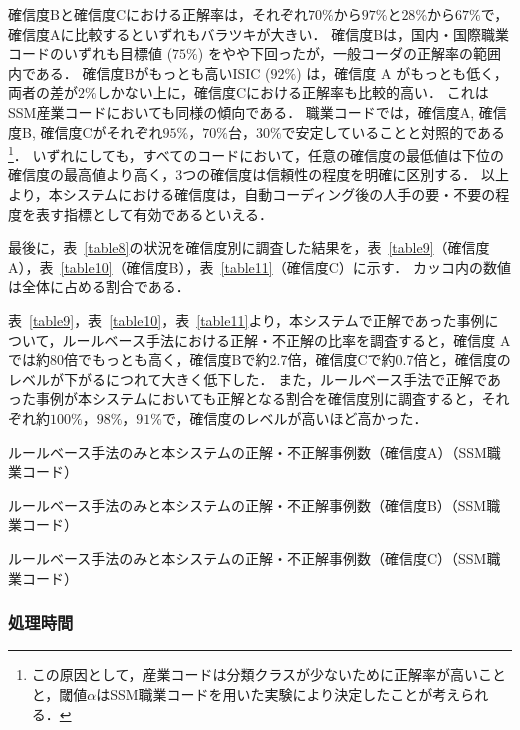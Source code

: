 \documentclass[japanese]{jnlp_1.4}
\begin{document}
確信度Bと確信度Cにおける正解率は，それぞれ$70\%$から$97\%$と$28\%$から$67\%$で，確信度Aに比較するといずれもバラツキが大きい．
確信度Bは，国内・国際職業コードのいずれも目標値 ($75\%$) をやや下回ったが，一般コーダの正解率の範囲内である． 
確信度Bがもっとも高いISIC ($92\%$) は，確信度 A がもっとも低く，両者の差が$2\%$しかない上に，確信度Cにおける正解率も比較的高い．
これはSSM産業コードにおいても同様の傾向である．
職業コードでは，確信度A, 確信度B, 確信度Cがそれぞれ$95\%$，$70\%$台，$30\%$で安定していることと対照的である\footnote{この原因として，産業コードは分類クラスが少ないために正解率が高いことと，閾値$\alpha$はSSM職業コードを用いた実験により決定したことが考えられる．}．
いずれにしても，すべてのコードにおいて，任意の確信度の最低値は下位の確信度の最高値より高く，3つの確信度は信頼性の程度を明確に区別する．
以上より，本システムにおける確信度は，自動コーディング後の人手の要・不要の程度を表す指標として有効であるといえる．

最後に，表~\ref{table8}の状況を確信度別に調査した結果を，表~\ref{table9}（確信度 A），表~\ref{table10}（確信度B），表~\ref{table11}（確信度C）に示す．
カッコ内の数値は全体に占める割合である．

表~\ref{table9}，表~\ref{table10}，表~\ref{table11}より，本システムで正解であった事例について，ルールベース手法における正解・不正解の比率を調査すると，確信度 A では約80倍でもっとも高く，確信度Bで約2.7倍，確信度Cで約0.7倍と，確信度のレベルが下がるにつれて大きく低下した．
また，ルールベース手法で正解であった事例が本システムにおいても正解となる割合を確信度別に調査すると，それぞれ約$100\%$，$98\%$，$91\%$で，確信度のレベルが高いほど高かった．

\begin{table}[t]
\caption{ルールベース手法のみと本システムの正解・不正解事例数（確信度A）（SSM職業コード）}
\label{table9}

\end{table}
\begin{table}[t]
\caption{ルールベース手法のみと本システムの正解・不正解事例数（確信度B）（SSM職業コード）}
\label{table10}

\end{table}
\begin{table}[t]
\caption{ルールベース手法のみと本システムの正解・不正解事例数（確信度C）（SSM職業コード）}
\label{table11}

\end{table}


\subsubsection{処理時間}
\end{document}
